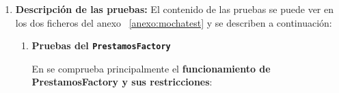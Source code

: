\begin{enumerate}
\begin{lstlisting}[language=Solidity, caption={Parametrización de préstamos en curso}]
        prestamo1 = await new web3.eth.Contract(prestamoCursandoBuild.abi,prestamo1address);
        prestamo2 = await new web3.eth.Contract(prestamoCursandoBuild.abi,prestamo2address);
        
    });
    \end{lstlisting}

    \item \textbf{Descripción de las pruebas:} El contenido de las pruebas se puede ver en
    los dos ficheros del anexo ~\ref{anexo:mochatest} y se describen a 
    continuación:
            \begin{enumerate}
                \item \textbf{Pruebas del \texttt{PrestamosFactory}}

                En  se comprueba principalmente el \textbf{funcionamiento de PrestamosFactory y sus restricciones}:


\end{enumerate}
\end{enumerate}
